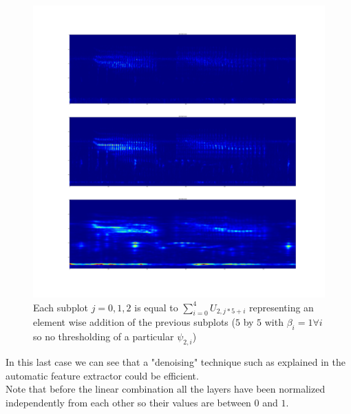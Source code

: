 \documentclass[a4paper]{report}
\begin{document}
\begin{figure}[H]
\begin{center}
\includegraphics[scale=0.1]{RN819_3.png}\caption{Each subplot $j=0,1,2$ is equal to $\sum_{i=0}^4 U_{2,j*5+i}$ representing an element wise addition of the previous subplots ($5$ by $5$ with $\beta_i=1\forall i$ so no thresholding of a particular $\psi_{2,i}$) }
\end{center}
\end{figure}
In this last case we can see that a "denoising" technique such as explained in the automatic feature extractor could be efficient.\\
Note that before the linear combination all the layers have been normalized independently from each other so their values are between $0$ and $1$.
\end{document}
